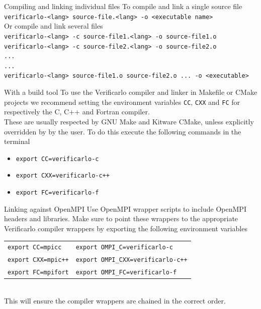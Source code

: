 \documentclass[aspectratio=169]{beamer}
\newcommand{\tabitem}{\hspace{2ex}\llap{\scriptsize{$\blacksquare$}}\hspace{1ex}}
\begin{document}
    \begin{frame}{Compiling and linking individual files}
      To compile and link a single source file\\
      \texttt{verificarlo-<lang> source-file.<lang> -o <executable name>}\\
      \vspace{1em}
      Or compile and link several files\\
      \texttt{verificarlo-<lang> -c source-file1.<lang> -o source-file1.o}\\
      \texttt{verificarlo-<lang> -c source-file2.<lang> -o source-file2.o}\\
      \texttt{...}\\
      \texttt{...}\\
      
      \texttt{verificarlo-<lang> source-file1.o source-file2.o ... -o <executable>}
    \end{frame}


    \begin{frame}{With a build tool}
      To use the Verificarlo compiler and linker in Makefile or CMake projects we recommend setting the environment variables \texttt{CC}, \texttt{CXX} and \texttt{FC} for respectively the C, C++ and Fortran compiler.      \vspace{1em}\\
      These are usually respected by GNU Make and Kitware CMake, unless explicitly overridden by by the user. To do this execute the following commands in the terminal
      \vspace{1em}
      \begin{itemize}
        \item \texttt{export CC=verificarlo-c}
        \item \texttt{export CXX=verificarlo-c++}
        \item \texttt{export FC=verificarlo-f}
      \end{itemize}

    \end{frame}

    \begin{frame}{Linking against OpenMPI}
      Use OpenMPI wrapper scripts to include OpenMPI headers and libraries. Make sure to point these wrappers to the appropriate Verificarlo compiler wrappers by exporting the following environment variables    \vspace{1em}\\
      \begin{tabular}{ll}
        \tabitem\texttt{export CC=mpicc} & \tabitem\texttt{export OMPI\_C=verificarlo-c} \\
        \tabitem\texttt{export CXX=mpic++} & \tabitem\texttt{export OMPI\_CXX=verificarlo-c++} \\
        \tabitem\texttt{export FC=mpifort} & \tabitem\texttt{export OMPI\_FC=verificarlo-f}
      \end{tabular}\vspace{1em}\\
      This will ensure the compiler wrappers are chained in the correct order.
    \end{frame}
      
\end{document}
